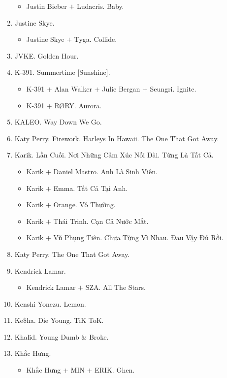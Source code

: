 \documentclass{article}
\begin{document}
\begin{enumerate}
	\begin{itemize}
		\item {\sc Justin Bieber $+$ Ludacris.} Baby.
	\end{itemize}
	\item {\sc Justine Skye.}
	\begin{itemize}
		\item {\sc Justine Skye $+$ Tyga.} Collide.
	\end{itemize}
	\item{\sc JVKE.} Golden Hour.
	\item {\sc K-391.} Summertime [Sunshine].
	\begin{itemize}
		\item {\sc K-391 $+$ Alan Walker $+$ Julie Bergan $+$ Seungri.} Ignite.
		\item {\sc K-391 $+$ R{\O}RY.} Aurora.
	\end{itemize}
	\item {\sc KALEO.} Way Down We Go.
	\item {\sc Katy Perry.} Firework. Harleys In Hawaii. The One That Got Away.
	\item {\sc Karik.} Lần Cuối. Nơi Những Cảm Xúc Nối Dài. Từng Là Tất Cả.
	\begin{itemize}
		\item {\sc Karik $+$ Daniel Mastro.} Anh Là Sinh Viên.
		\item {\sc Karik $+$ Emma.} Tất Cả Tại Anh.
		\item {\sc Karik $+$ Orange.} Vô Thường.
		\item {\sc Karik $+$ Thái Trinh.} Cạn Cả Nước Mắt.
		\item {\sc Karik $+$ Vũ Phụng Tiên.} Chưa Từng Vì Nhau. Đau Vậy Đủ Rồi.
	\end{itemize}	
	\item {\sc Katy Perry.} The One That Got Away.
	\item {\sc Kendrick Lamar.}
	\begin{itemize}
		\item {\sc Kendrick Lamar $+$ SZA.} All The Stars.
	\end{itemize}
	\item {\sc Kenshi Yonezu.} Lemon.
	\item {\sc Ke\$ha.} Die Young. TiK ToK.
	\item {\sc Khalid.} Young Dumb \& Broke.
	\item {\sc Khắc Hưng.}
	\begin{itemize}
		\item {\sc Khắc Hưng $+$ MIN $+$ ERIK.} Ghen.

\end{itemize}
\end{enumerate}
\end{document}
